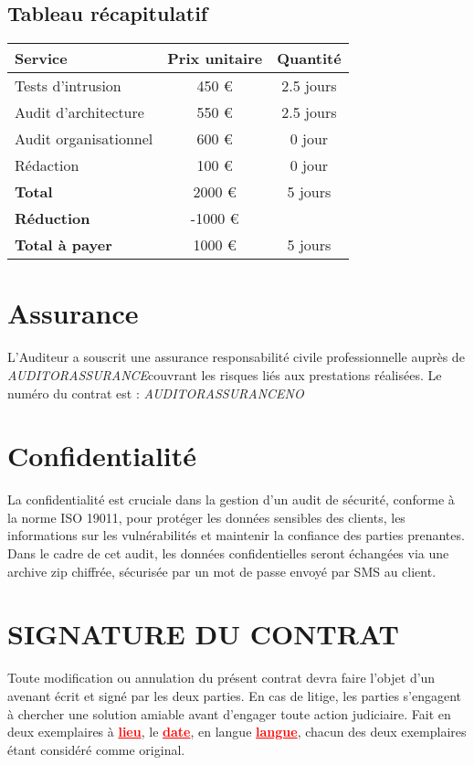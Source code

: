 \documentclass[12pt]{extarticle}
\begin{document}
\subsection{Tableau récapitulatif}
\begin{center}
    \begin{tabular}{lcc}
        \toprule
        \textbf{Service} & \textbf{Prix unitaire} & \textbf{Quantité} \\
        \midrule
        Tests d'intrusion & 450 € & 2.5 jours \\
        Audit d'architecture & 550 € & 2.5 jours \\
        Audit organisationnel & 600 € & 0 jour \\
        Rédaction & 100 € & 0 jour \\
        \midrule
        \textbf{Total} & 2000 € & 5 jours \\
        \midrule
        \textbf{Réduction} & -1000 € &  \\
        \midrule
        \textbf{Total à payer} & 1000 € & 5 jours \\
        \bottomrule
    \end{tabular}
\end{center}
\newpage

\section{Assurance}
L'Auditeur a souscrit une assurance responsabilité civile professionnelle auprès de \textit{ {{AUDITORASSURANCE}}}couvrant les risques liés aux prestations réalisées.
Le numéro du contrat est : \textit{ {{AUDITORASSURANCENO}}}

\section{Confidentialité}
La confidentialité est cruciale dans la gestion d'un audit de sécurité, conforme à la norme ISO 19011, pour protéger les données sensibles des clients, les informations sur les vulnérabilités et maintenir la confiance des parties prenantes.
Dans le cadre de cet audit, les données confidentielles seront échangées via une archive zip chiffrée, sécurisée par un mot de passe envoyé par SMS au client.
\newpage

\section{SIGNATURE DU CONTRAT}
Toute modification ou annulation du présent contrat devra faire l'objet d'un avenant écrit et signé par les deux parties. En cas de litige, les parties s'engagent à chercher une solution amiable avant d'engager toute action judiciaire.
Fait en deux exemplaires à \textcolor{red}{\textbf{\underline{lieu}}}, le \textcolor{red}{\textbf{\underline{date}}}, en langue \textcolor{red}{\textbf{\underline{langue}}}, chacun des deux exemplaires étant considéré comme original.
\end{document}
